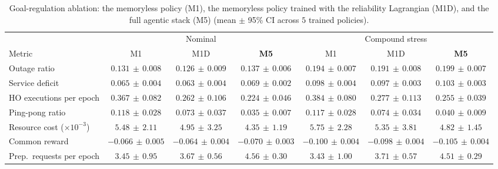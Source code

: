 \documentclass[journal]{IEEEtran}
\begin{document}
\begin{table}[t]
\centering
\caption{Goal-regulation ablation: the memoryless policy (M1), the memoryless policy trained with the reliability Lagrangian (M1D), and the full agentic stack (M5) (mean $\pm$ 95\% CI across $5$ trained policies).}
\label{tab:m1d}
\footnotesize
\setlength{\tabcolsep}{3.5pt}
\begin{tabular}{@{}lcccccc@{}}
\toprule
 & \multicolumn{3}{c}{Nominal} & \multicolumn{3}{c}{Compound stress}\\
\cmidrule(lr){2-4}\cmidrule(l){5-7}
Metric & M1 & M1D & \cellcolor{gray!15}\textbf{M5} & M1 & M1D & \cellcolor{gray!15}\textbf{M5}\\
\midrule
Outage ratio & $0.131\,{\pm}\,0.008$ & $0.126\,{\pm}\,0.009$ & $0.137\,{\pm}\,0.006$ & $0.194\,{\pm}\,0.007$ & $0.191\,{\pm}\,0.008$ & $0.199\,{\pm}\,0.007$\\
Service deficit & $0.065\,{\pm}\,0.004$ & $0.063\,{\pm}\,0.004$ & $0.069\,{\pm}\,0.002$ & $0.098\,{\pm}\,0.004$ & $0.097\,{\pm}\,0.003$ & $0.103\,{\pm}\,0.003$\\
HO executions per epoch & $0.367\,{\pm}\,0.082$ & $0.262\,{\pm}\,0.106$ & $0.224\,{\pm}\,0.046$ & $0.384\,{\pm}\,0.080$ & $0.277\,{\pm}\,0.113$ & $0.255\,{\pm}\,0.039$\\
Ping-pong ratio & $0.118\,{\pm}\,0.028$ & $0.073\,{\pm}\,0.037$ & $0.035\,{\pm}\,0.007$ & $0.117\,{\pm}\,0.028$ & $0.074\,{\pm}\,0.034$ & $0.040\,{\pm}\,0.009$\\
Resource cost ($\times10^{-3}$) & $5.48\,{\pm}\,2.11$ & $4.95\,{\pm}\,3.25$ & $4.35\,{\pm}\,1.19$ & $5.75\,{\pm}\,2.28$ & $5.35\,{\pm}\,3.81$ & $4.82\,{\pm}\,1.45$\\
Common reward & $-0.066\,{\pm}\,0.005$ & $-0.064\,{\pm}\,0.004$ & $-0.070\,{\pm}\,0.003$ & $-0.100\,{\pm}\,0.004$ & $-0.098\,{\pm}\,0.004$ & $-0.105\,{\pm}\,0.004$\\
Prep.\ requests per epoch & $3.45\,{\pm}\,0.95$ & $3.67\,{\pm}\,0.56$ & $4.56\,{\pm}\,0.30$ & $3.43\,{\pm}\,1.00$ & $3.71\,{\pm}\,0.57$ & $4.51\,{\pm}\,0.29$\\
\bottomrule
\end{tabular}
\end{table}
\end{document}
